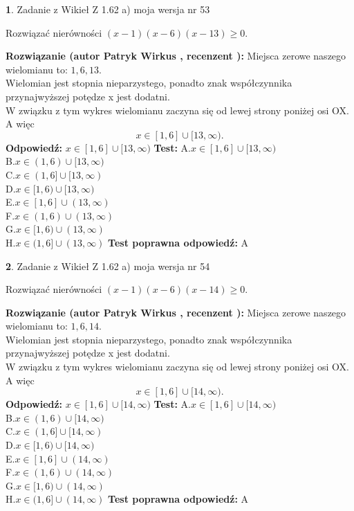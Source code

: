 \documentclass[12pt, a4paper]{article}
\theoremstyle{definition} %
\newtheorem{zad}{}
\newcommand{\zadStart}[1]{\begin{zad}#1\newline}
\newcommand{\zadStop}{\end{zad}}
\newcommand{\rozwStart}[2]{\noindent \textbf{Rozwiązanie (autor #1 , recenzent #2): }\newline}
\newcommand{\rozwStop}{\newline}
\newcommand{\odpStart}{\noindent \textbf{Odpowiedź:}\newline}
\newcommand{\odpStop}{\newline}
\newcommand{\testStart}{\noindent \textbf{Test:}\newline}
\newcommand{\testStop}{\newline}
\newcommand{\kluczStart}{\noindent \textbf{Test poprawna odpowiedź:}\newline}
\newcommand{\kluczStop}{\newline}
\begin{document}
\zadStart{Zadanie z Wikieł Z 1.62 a) moja wersja nr 53}

Rozwiązać nierówności $(x-1)(x-6)(x-13)\ge0$.
\zadStop
\rozwStart{Patryk Wirkus}{}
Miejsca zerowe naszego wielomianu to: $1, 6, 13$.\\
Wielomian jest stopnia nieparzystego, ponadto znak współczynnika przy\linebreak najwyższej potędze x jest dodatni.\\ W związku z tym wykres wielomianu zaczyna się od lewej strony poniżej osi OX. A więc $$x \in [1,6] \cup [13,\infty).$$
\rozwStop
\odpStart
$x \in [1,6] \cup [13,\infty)$
\odpStop
\testStart
A.$x \in [1,6] \cup [13,\infty)$\\
B.$x \in (1,6) \cup [13,\infty)$\\
C.$x \in (1,6] \cup [13,\infty)$\\
D.$x \in [1,6) \cup [13,\infty)$\\
E.$x \in [1,6] \cup (13,\infty)$\\
F.$x \in (1,6) \cup (13,\infty)$\\
G.$x \in [1,6) \cup (13,\infty)$\\
H.$x \in (1,6] \cup (13,\infty)$
\testStop
\kluczStart
A
\kluczStop



\zadStart{Zadanie z Wikieł Z 1.62 a) moja wersja nr 54}

Rozwiązać nierówności $(x-1)(x-6)(x-14)\ge0$.
\zadStop
\rozwStart{Patryk Wirkus}{}
Miejsca zerowe naszego wielomianu to: $1, 6, 14$.\\
Wielomian jest stopnia nieparzystego, ponadto znak współczynnika przy\linebreak najwyższej potędze x jest dodatni.\\ W związku z tym wykres wielomianu zaczyna się od lewej strony poniżej osi OX. A więc $$x \in [1,6] \cup [14,\infty).$$
\rozwStop
\odpStart
$x \in [1,6] \cup [14,\infty)$
\odpStop
\testStart
A.$x \in [1,6] \cup [14,\infty)$\\
B.$x \in (1,6) \cup [14,\infty)$\\
C.$x \in (1,6] \cup [14,\infty)$\\
D.$x \in [1,6) \cup [14,\infty)$\\
E.$x \in [1,6] \cup (14,\infty)$\\
F.$x \in (1,6) \cup (14,\infty)$\\
G.$x \in [1,6) \cup (14,\infty)$\\
H.$x \in (1,6] \cup (14,\infty)$
\testStop
\kluczStart
A
\kluczStop
\end{document}

